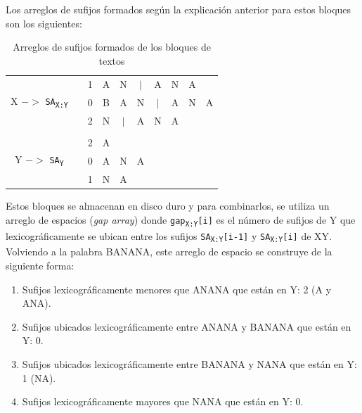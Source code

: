 Los arreglos de sufijos formados según la explicación anterior para estos bloques son los siguientes:

\newpage

\begin{table}[h]
\centering
\begin{tabular}{cccccccccc}
\cline{3-3}
                   & \multicolumn{1}{c|}{} & \multicolumn{1}{c|}{1} & A & N & $|$ & A & N & A &   \\ \cline{3-3}
X $->$ \texttt{SA\textsubscript{X:Y}} & \multicolumn{1}{c|}{} & \multicolumn{1}{c|}{0} & B & A & N & $|$ & A & N & A \\ \cline{3-3}
                   & \multicolumn{1}{c|}{} & \multicolumn{1}{c|}{2} & N & $|$ & A & N & A &   &   \\ \cline{3-3}
                   &                       &                        &   &   &   &   &   &   &   \\ \cline{3-3}
                   & \multicolumn{1}{c|}{} & \multicolumn{1}{c|}{2} & A &   &   &   &   &   &   \\ \cline{3-3}
Y $->$ \texttt{SA\textsubscript{Y}} & \multicolumn{1}{c|}{} & \multicolumn{1}{c|}{0} & A & N & A &   &   &   &   \\ \cline{3-3}
                   & \multicolumn{1}{c|}{} & \multicolumn{1}{c|}{1} & N & A &   &   &   &   &   \\ \cline{3-3}
\end{tabular}
\caption{Arreglos de sufijos formados de los bloques de textos}
\end{table}

Estos bloques se almacenan en disco duro y para combinarlos, se utiliza un arreglo de espacios (\textit{gap array}) donde \texttt{gap\textsubscript{X:Y}[i]} es el número de sufijos de Y que lexicográficamente se ubican entre los sufijos \texttt{SA\textsubscript{X:Y}[i-1]} y \texttt{SA\textsubscript{X:Y}[i]} de XY. Volviendo a la palabra BANANA, este arreglo de espacio se construye de la siguiente forma:

\begin{enumerate}

\item Sufijos lexicográficamente menores que ANANA que están en Y: 2 (A y ANA).
\item Sufijos ubicados lexicográficamente entre ANANA y BANANA que están en Y: 0.
\item Sufijos ubicados lexicográficamente entre BANANA y NANA que están en Y: 1 (NA).
\item Sufijos lexicográficamente mayores que NANA que están en Y: 0.

\end{enumerate}

